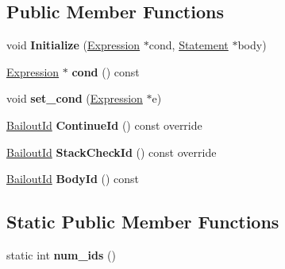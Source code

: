 \subsection*{Public Member Functions}
\begin{DoxyCompactItemize}
\item 
void {\bfseries Initialize} (\hyperlink{classv8_1_1internal_1_1_expression}{Expression} $\ast$cond, \hyperlink{classv8_1_1internal_1_1_statement}{Statement} $\ast$body)\hypertarget{classv8_1_1internal_1_1_while_statement_a6610a43ac9c87a2f6aaebfbe4df791fe}{}\label{classv8_1_1internal_1_1_while_statement_a6610a43ac9c87a2f6aaebfbe4df791fe}

\item 
\hyperlink{classv8_1_1internal_1_1_expression}{Expression} $\ast$ {\bfseries cond} () const \hypertarget{classv8_1_1internal_1_1_while_statement_ab927b3055e8d69a1331625b7631c7296}{}\label{classv8_1_1internal_1_1_while_statement_ab927b3055e8d69a1331625b7631c7296}

\item 
void {\bfseries set\+\_\+cond} (\hyperlink{classv8_1_1internal_1_1_expression}{Expression} $\ast$e)\hypertarget{classv8_1_1internal_1_1_while_statement_a73ccd7f7cc202f540458366683c6f865}{}\label{classv8_1_1internal_1_1_while_statement_a73ccd7f7cc202f540458366683c6f865}

\item 
\hyperlink{classv8_1_1internal_1_1_bailout_id}{Bailout\+Id} {\bfseries Continue\+Id} () const  override\hypertarget{classv8_1_1internal_1_1_while_statement_a7195e1b13a93e7898e7ec9f0e7e9fcfb}{}\label{classv8_1_1internal_1_1_while_statement_a7195e1b13a93e7898e7ec9f0e7e9fcfb}

\item 
\hyperlink{classv8_1_1internal_1_1_bailout_id}{Bailout\+Id} {\bfseries Stack\+Check\+Id} () const  override\hypertarget{classv8_1_1internal_1_1_while_statement_ad9df4a43cd1ac3e1bd340e09cb1e0343}{}\label{classv8_1_1internal_1_1_while_statement_ad9df4a43cd1ac3e1bd340e09cb1e0343}

\item 
\hyperlink{classv8_1_1internal_1_1_bailout_id}{Bailout\+Id} {\bfseries Body\+Id} () const \hypertarget{classv8_1_1internal_1_1_while_statement_ac34b7b391935ec3153b8ab469784c91e}{}\label{classv8_1_1internal_1_1_while_statement_ac34b7b391935ec3153b8ab469784c91e}

\end{DoxyCompactItemize}
\subsection*{Static Public Member Functions}
\begin{DoxyCompactItemize}
\item 
static int {\bfseries num\+\_\+ids} ()\hypertarget{classv8_1_1internal_1_1_while_statement_a666e9580b2b8683c7b2557f7a752b9a2}{}\label{classv8_1_1internal_1_1_while_statement_a666e9580b2b8683c7b2557f7a752b9a2}

\end{DoxyCompactItemize}
